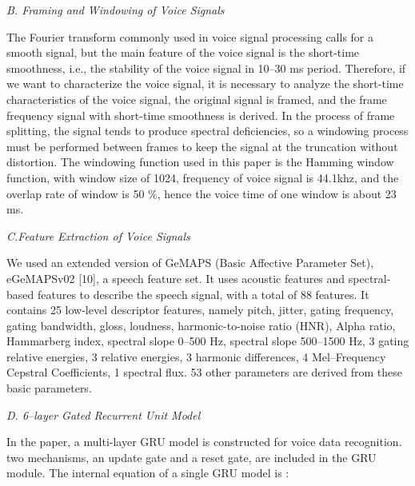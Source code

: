 \documentclass{article}
\begin{document}
\begin{multicols*}{2}
\vspace{3mm}
\hspace{-5mm}\textit{B. Framing and Windowing of Voice Signals}
\vspace{2mm}

The Fourier transform commonly used in voice signal
processing calls for a smooth signal, but the main feature
of the voice signal is the short-time smoothness, i.e.,
the stability of the voice signal in 10–30 ms period.
Therefore, if we want to characterize the voice signal,
it is necessary to analyze the short-time characteristics
of the voice signal, the original signal is framed, and
the frame frequency signal with short-time smoothness
is derived. In the process of frame splitting, the signal
tends to produce spectral deficiencies, so a windowing
process must be performed between frames to keep the
signal at the truncation without distortion. The windowing function used in this paper is the Hamming window
function, with window size of 1024, frequency of voice
signal is 44.1khz, and the overlap rate of window is 50
\%, hence the voice time of one window is about 23 ms.

\vspace{3mm}
\hspace{-5mm}\textit{C.Feature Extraction of Voice Signals}
\vspace{2mm}

We used an extended version of GeMAPS (Basic
Affective Parameter Set), eGeMAPSv02 [10], a speech
feature set. It uses acoustic features and spectral-based
features to describe the speech signal, with a total of
88 features. It contains 25 low-level descriptor features,
namely pitch, jitter, gating frequency, gating bandwidth,
gloss, loudness, harmonic-to-noise ratio (HNR), Alpha
ratio, Hammarberg index, spectral slope 0–500 Hz, spectral slope 500–1500 Hz, 3 gating relative energies, 3 relative energies, 3 harmonic differences, 4 Mel–Frequency
Cepstral Coefficients, 1 spectral flux. 53 other parameters
are derived from these basic parameters.

\vspace{3mm}
\hspace{-5mm}\textit{D. 6–layer Gated Recurrent Unit Model}
\vspace{2mm}

In the paper, a multi-layer GRU model is constructed
for voice data recognition. two mechanisms, an update
gate and a reset gate, are included in the GRU module.
The internal equation of a single GRU model is :
\end{multicols*}
\end{document}

